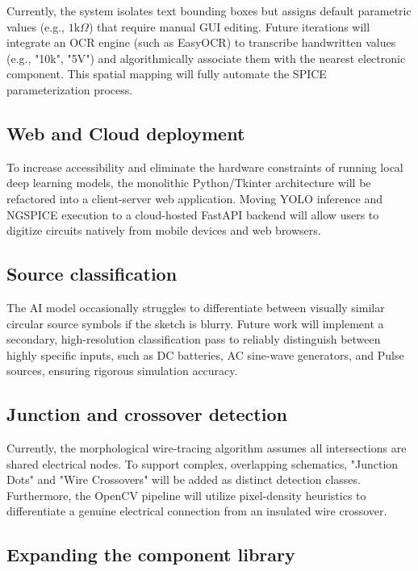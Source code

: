 \documentclass[12pt]{article}
\begin{document}
Currently, the system isolates text bounding boxes but assigns default parametric values (e.g., $1\text{k}\Omega$) that require manual GUI editing. Future iterations will integrate an OCR engine (such as EasyOCR) to transcribe handwritten values (e.g., "10k", "5V") and algorithmically associate them with the nearest electronic component. This spatial mapping will fully automate the SPICE parameterization process.

\subsection{Web and Cloud deployment}

To increase accessibility and eliminate the hardware constraints of running local deep learning models, the monolithic Python/Tkinter architecture will be refactored into a client-server web application. Moving YOLO inference and NGSPICE execution to a cloud-hosted FastAPI backend will allow users to digitize circuits natively from mobile devices and web browsers.

\subsection{Source classification}

The AI model occasionally struggles to differentiate between visually similar circular source symbols if the sketch is blurry. Future work will implement a secondary, high-resolution classification pass to reliably distinguish between highly specific inputs, such as DC batteries, AC sine-wave generators, and Pulse sources, ensuring rigorous simulation accuracy.

\subsection{Junction and crossover detection}

Currently, the morphological wire-tracing algorithm assumes all intersections are shared electrical nodes. To support complex, overlapping schematics, "Junction Dots" and "Wire Crossovers" will be added as distinct detection classes. Furthermore, the OpenCV pipeline will utilize pixel-density heuristics to differentiate a genuine electrical connection from an insulated wire crossover.

\subsection{Expanding the component library}
\end{document}
